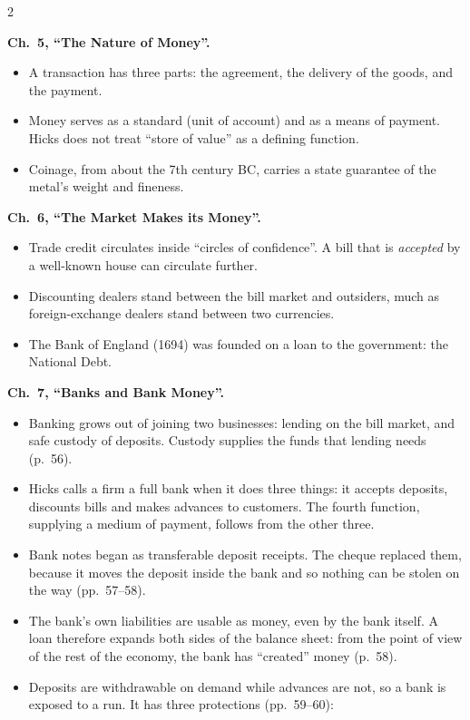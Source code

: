 \begin{paracol}{2}
\begin{reading}
\textbf{Ch.~5, ``The Nature of Money''.}
\begin{itemize}
  \item A transaction has three parts: the agreement, the delivery of the goods, and the payment.
  \item Money serves as a standard (unit of account) and as a means of payment. Hicks does not treat ``store of value'' as a defining function.
  \item Coinage, from about the 7th century BC, carries a state guarantee of the metal's weight and fineness.
\end{itemize}
\textbf{Ch.~6, ``The Market Makes its Money''.}
\begin{itemize}
  \item Trade credit circulates inside ``circles of confidence''. A bill that is \emph{accepted} by a well-known house can circulate further.
  \item Discounting dealers stand between the bill market and outsiders, much as foreign-exchange dealers stand between two currencies.
  \item The Bank of England (1694) was founded on a loan to the government: the National Debt.
\end{itemize}
\textbf{Ch.~7, ``Banks and Bank Money''.}
\begin{itemize}
  \item Banking grows out of joining two businesses: lending on the bill market, and safe custody of deposits. Custody supplies the funds that lending needs (p.~56).
  \item Hicks calls a firm a full bank when it does three things: it accepts deposits, discounts bills and makes advances to customers. The fourth function, supplying a medium of payment, follows from the other three.
  \item Bank notes began as transferable deposit receipts. The cheque replaced them, because it moves the deposit inside the bank and so nothing can be stolen on the way (pp.~57--58).
  \item The bank's own liabilities are usable as money, even by the bank itself. A loan therefore expands both sides of the balance sheet: from the point of view of the rest of the economy, the bank has ``created'' money (p.~58).
  \item Deposits are withdrawable on demand while advances are not, so a bank is exposed to a run. It has three protections (pp.~59--60):

\end{itemize}
\end{reading}
\end{paracol}
